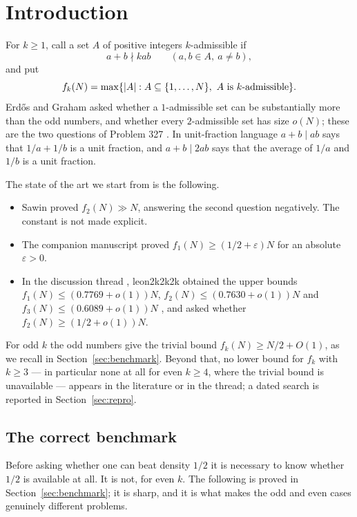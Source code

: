 \documentclass[11pt]{article}
\begin{document}
\section{Introduction}\label{sec:intro}

For \(k\geq1\), call a set \(A\) of positive integers \(k\)-admissible if
\begin{equation}\label{eq:kadm}
 a+b\nmid kab\qquad(a,b\in A,\ a\ne b),
\end{equation}
and put
\[
 f_k(N)=\max\{\abs{A}:A\subseteq\{1,\ldots,N\},\ A\text{ is }k\text{-admissible}\}.
\]
Erd\H{o}s and Graham \cite[p.~37]{ErdosGraham1980} asked whether a
\(1\)-admissible set can be substantially more than the odd numbers, and
whether every \(2\)-admissible set has size \(o(N)\); these are the two
questions of Problem 327 \cite{ErdosProblem327}. In unit-fraction language
\(a+b\mid ab\) says that \(1/a+1/b\) is a unit fraction, and \(a+b\mid2ab\)
says that the average of \(1/a\) and \(1/b\) is a unit fraction.

The state of the art we start from is the following.
\begin{itemize}
\item Sawin \cite{Sawin2026} proved \(f_2(N)\gg N\), answering the second
      question negatively. The constant is not made explicit.
\item The companion manuscript \cite{DellaPietra2026} proved
      \(f_1(N)\geq(1/2+\varepsilon)N\) for an absolute \(\varepsilon>0\).
\item In the discussion thread \cite{Erdos327Thread}, leon2k2k2k obtained the
      upper bounds \(f_1(N)\leq(0.7769+o(1))N\),
      \(f_2(N)\leq(0.7630+o(1))N\) and \(f_3(N)\leq(0.6089+o(1))N\)
      \cite{Leon2026}, and asked whether
      \(f_2(N)\geq(1/2+o(1))N\).
\end{itemize}
For odd \(k\) the odd numbers give the trivial bound
\(f_k(N)\geq N/2+O(1)\), as we recall in Section~\ref{sec:benchmark}. Beyond
that, no lower bound for \(f_k\) with \(k\geq3\) --- in particular none at all
for even \(k\geq4\), where the trivial bound is unavailable --- appears in the
literature or in the thread; a dated search is reported in
Section~\ref{sec:repro}.

\subsection{The correct benchmark}

Before asking whether one can beat density \(1/2\) it is necessary to know
whether \(1/2\) is available at all. It is not, for even \(k\). The following
is proved in Section~\ref{sec:benchmark}; it is sharp, and it is what makes the
odd and even cases genuinely different problems.
\end{document}
